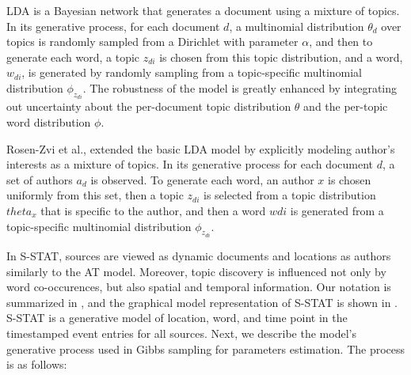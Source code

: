 \documentclass{sig-alternate}
\newcommand{\model}{{S-STAT}\xspace} %
\begin{document}
LDA is a Bayesian network that generates a document using a mixture of topics. In its generative process, for each document $d$, a multinomial distribution $\theta_d$ over topics is randomly sampled from a Dirichlet with parameter $\alpha$, and then to generate each word, a topic $z_{di}$ is chosen from this topic distribution, and a word, $w_{di}$, is generated by randomly sampling from a topic-specific multinomial distribution $\phi_{z_{di}}$. The robustness of the model is greatly enhanced by integrating out uncertainty about the per-document topic distribution $\theta$ and the per-topic word distribution $\phi$. 

Rosen-Zvi et al., extended the basic LDA model by explicitly modeling author's interests as a mixture of topics. In its generative process for each document $d$, a set of authors $a_d$ is observed. To generate each word, an author $x$ is chosen uniformly from this set, then a topic $z_{di}$ is selected from a topic distribution $theta_{x}$ that is specific to the author, and then a word  $w{di}$ is generated from a topic-specific multinomial distribution $\phi_{z_{di}}$.

In \model, sources are viewed as dynamic documents and locations as authors similarly to the AT model. Moreover, topic discovery is influenced not only by word co-occurences, but also spatial and temporal information. Our notation is summarized in , and the graphical model representation of \model is shown in .  \model is a generative model of location, word, and time point in the timestamped event entries for all sources. Next, we describe the model's generative process used in Gibbs sampling for parameters estimation. The process is as follows: 
\end{document}
